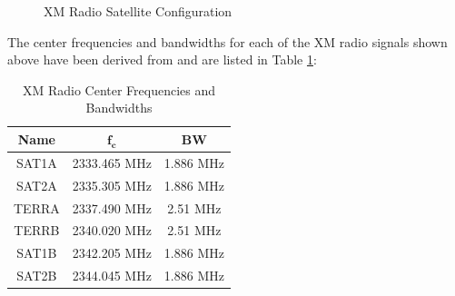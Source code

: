 \documentclass[conference,onecolumn]{IEEEtran}
\begin{document}

\begin{figure}[H]
	\centerline{}
	\caption{XM Radio Satellite Configuration \cite{5586866}}
	\label{fig::xm_satellite_config}
\end{figure}

	\noindent The center frequencies and bandwidths for each of the XM radio signals shown above have been derived from \cite{andreas_2010_us8594559b2} and are listed in Table \ref{table::center_freq_and_bw}:
\vspace{-12pt}
\begin{table}[H]
	\begin{center}
	\caption{XM Radio Center Frequencies and Bandwidths}
	\label{table::center_freq_and_bw}
	\begin{tabular}{| c | c | c |}
		\hline
		\textbf{Name} & $\mathbf{f_c}$ & \textbf{BW}\\
		\hline
		SAT1A & 2333.465 MHz & 1.886 MHz\\
		\hline
		SAT2A & 2335.305 MHz & 1.886 MHz\\
		\hline
		TERRA & 2337.490 MHz & 2.51 MHz \\
		\hline
		TERRB & 2340.020 MHz & 2.51 MHz \\
		\hline
		SAT1B & 2342.205 MHz & 1.886 MHz\\
		\hline
		SAT2B & 2344.045 MHz & 1.886 MHz\\
		\hline
	\end{tabular}
	\end{center}
\end{table}
\end{document}
